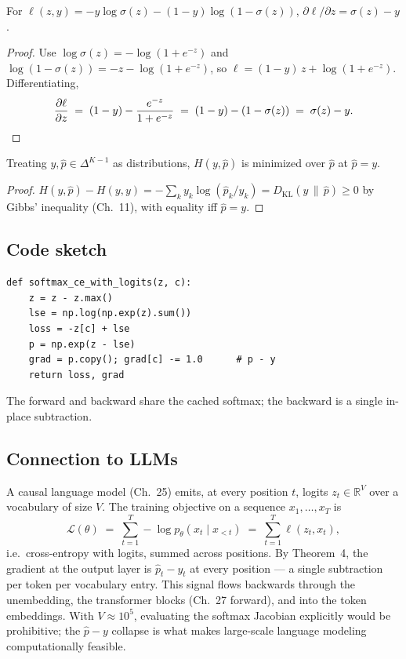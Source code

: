 \begin{theorem}
For $\ell(z, y) = -y\log \sigma(z) - (1-y)\log(1-\sigma(z))$, $\partial \ell/\partial z = \sigma(z) - y$.
\end{theorem}
\begin{proof}
Use $\log \sigma(z) = -\log(1+e^{-z})$ and $\log(1-\sigma(z)) = -z - \log(1+e^{-z})$, so
$\ell = (1-y)\,z + \log(1+e^{-z})$. Differentiating,
\[
\frac{\partial \ell}{\partial z} \;=\; (1-y) - \frac{e^{-z}}{1+e^{-z}} \;=\; (1-y) - (1-\sigma(z)) \;=\; \sigma(z) - y. \qedhere
\]
\end{proof}

\begin{theorem}[CE minimum at $\hat p = y$]
Treating $y, \hat p \in \Delta^{K-1}$ as distributions, $H(y, \hat p)$ is minimized over $\hat p$ at
$\hat p = y$.
\end{theorem}
\begin{proof}
$H(y, \hat p) - H(y, y) = -\sum_k y_k \log(\hat p_k / y_k) = D_{\mathrm{KL}}(y \,\|\, \hat p) \ge 0$ by
Gibbs' inequality (Ch.~11), with equality iff $\hat p = y$.
\end{proof}

\subsection*{Code sketch}

\begin{verbatim}
def softmax_ce_with_logits(z, c):
    z = z - z.max()
    lse = np.log(np.exp(z).sum())
    loss = -z[c] + lse
    p = np.exp(z - lse)
    grad = p.copy(); grad[c] -= 1.0      # p - y
    return loss, grad
\end{verbatim}

The forward and backward share the cached softmax; the backward is a single in-place subtraction.

\subsection*{Connection to LLMs}

A causal language model (Ch.~25) emits, at every position $t$, logits $z_t \in \mathbb{R}^V$ over a
vocabulary of size $V$. The training objective on a sequence $x_1, \dots, x_T$ is
\[
\mathcal{L}(\theta) \;=\; \sum_{t=1}^{T} -\log p_\theta(x_t \mid x_{<t}) \;=\; \sum_{t=1}^{T} \ell(z_t, x_t),
\]
i.e.\ cross-entropy with logits, summed across positions. By Theorem~4, the gradient at the output layer is
$\hat p_t - y_t$ at every position --- a single subtraction per token per vocabulary entry. This signal
flows backwards through the unembedding, the transformer blocks (Ch.~27 forward), and into the token
embeddings. With $V \approx 10^5$, evaluating the softmax Jacobian explicitly would be prohibitive; the
$\hat p - y$ collapse is what makes large-scale language modeling computationally feasible.

